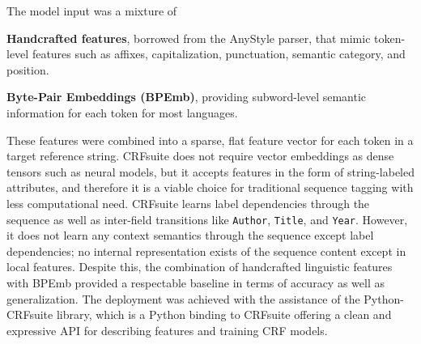 The model input was a mixture of
\begin{compactitem}
\item \textbf{Handcrafted features}, borrowed from the AnyStyle parser, that mimic token-level features such as affixes, capitalization, punctuation, semantic category, and position.
\item \textbf{Byte-Pair Embeddings (BPEmb)}, providing subword-level semantic information for each token for most languages.
\end{compactitem}
These features were combined into a sparse, flat feature vector for each token in a target reference string. CRFsuite does not require vector embeddings as dense tensors such as neural models, but it accepts features in the form of string-labeled attributes, and therefore it is a viable choice for traditional sequence tagging with less computational need.
CRFsuite learns label dependencies through the sequence as well as inter-field transitions like \texttt{Author}, \texttt{Title}, and \texttt{Year}. However, it does not learn any context semantics through the sequence except label dependencies; no internal representation exists of the sequence content except in local features. Despite this, the combination of handcrafted linguistic features with BPEmb provided a respectable baseline in terms of accuracy as well as generalization.
The deployment was achieved with the assistance of the Python-CRFsuite library, which is a Python binding to CRFsuite offering a clean and expressive API for describing features and training CRF models.


